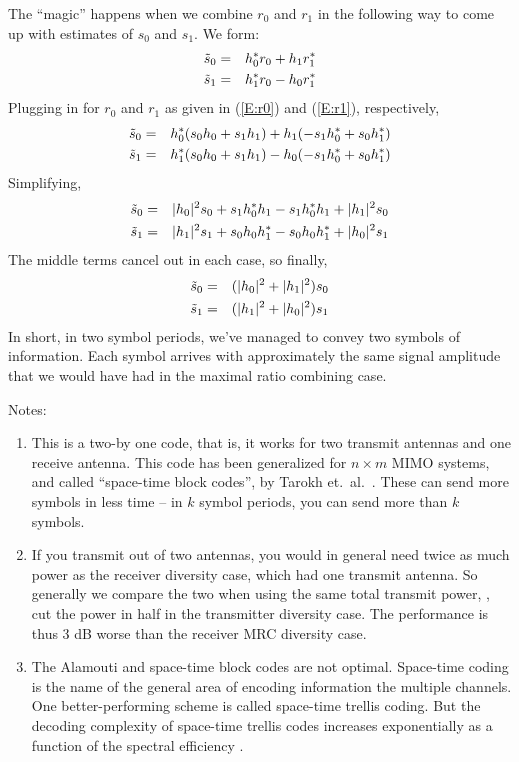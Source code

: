 The ``magic'' happens when we combine $r_0$ and $r_1$ in the following way to come up with estimates of $s_0$ and $s_1$.  We form:
\begin{eqnarray}
\tilde{s}_0 &=& h_0^* r_0 + h_1 r_1^* \nonumber \\ 
\tilde{s}_1 &=& h_1^* r_0 - h_0 r_1^* \nonumber
\end{eqnarray}
Plugging in for $r_0$ and $r_1$ as given in (\ref{E:r0}) and (\ref{E:r1}), respectively,
\begin{eqnarray}
\tilde{s}_0 &=& h_0^* (s_0 h_0 + s_1 h_1) + h_1 (-s_1 h_0^*  + s_0 h_1^* ) \nonumber \\ 
\tilde{s}_1 &=& h_1^* (s_0 h_0  + s_1 h_1) - h_0  (-s_1 h_0^*  + s_0 h_1^*) \nonumber
\end{eqnarray}
Simplifying,
\begin{eqnarray}
\tilde{s}_0 &=& |h_0|^2 s_0 + s_1 h_0^* h_1  -s_1 h_0^* h_1  + |h_1|^2 s_0  \nonumber \\ 
\tilde{s}_1 &=& |h_1|^2 s_1 + s_0 h_0 h_1^*  - s_0 h_0 h_1^*  + |h_0|^2 s_1  \nonumber
\end{eqnarray}
The middle terms cancel out in each case, so finally,
\begin{eqnarray}
\tilde{s}_0 &=& (|h_0|^2 + |h_1|^2) s_0  \nonumber \\ 
\tilde{s}_1 &=& (|h_1|^2 + |h_0|^2) s_1  \nonumber
\end{eqnarray}
In short, in two symbol periods, we've managed to convey two symbols of information.  Each symbol arrives with approximately the same signal amplitude that we would have had in the maximal ratio combining case.

Notes:  
\begin{enumerate}
%
\item This is a two-by one code, that is, it works for two transmit antennas and one receive antenna.  This code has been generalized for $n\times m$ MIMO systems, and called ``space-time block codes'', by Tarokh et.~al.~\cite{tarokh1999space}.  These can send more symbols in less time -- in $k$ symbol periods, you can send more than $k$ symbols.
%
\item If you transmit out of two antennas, you would in general need twice as much power as the receiver diversity case, which had one transmit antenna.  So generally we compare the two when using the same total transmit power, \ie, cut the power in half in the transmitter diversity case.  The performance is thus 3 dB worse than the receiver MRC diversity case.
%
\item The Alamouti and space-time block codes are not optimal.  Space-time coding is the name of the general area of encoding information the multiple channels.  One better-performing scheme is called space-time trellis coding.  But the decoding complexity of space-time trellis codes increases exponentially as a function of the spectral efficiency \cite[p377]{haykin2005modern} \cite{tarokh1999space}.
%
\end{enumerate}


